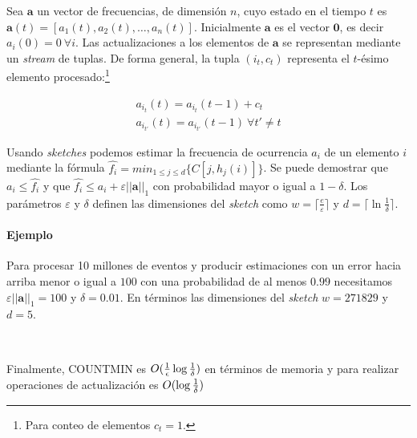 \documentclass[a4paper,10pt, oneside]{article}
\begin{document}
Sea $\mathbf{a}$ un vector de frecuencias, de dimensión $n$, cuyo estado en el tiempo $t$ es $\mathbf{a}(t)=[a_1(t), a_2(t), \dots, a_n(t)]$. Inicialmente $\mathbf{a}$ es el vector $\mathbf{0}$, es decir $a_i(0)=0 \ \forall i$. Las actualizaciones a los elementos de $\mathbf{a}$ se representan mediante un \textit{stream} de tuplas. De forma general, la tupla $(i_t, c_t)$ representa el $t$-ésimo elemento procesado:\footnote{Para conteo de elementos $c_t=1$.}

\begin{gather*}
a_{i_t}(t)=a_{i_t}(t-1) + c_t\\
a_{i_{t'}}(t)=a_{i_{t'}}(t-1) \ \forall t' \neq t 
\end{gather*}

Usando \textit{sketches} podemos estimar la frecuencia de ocurrencia $a_i$ de un elemento $i$ mediante la fórmula $\hat{f_i} = min_{1 \leq j \leq d}\{C[j,h_j(i)]\}$. Se puede demostrar que $a_i \leq \hat{f_i}$ y que $\hat{f_i} \leq a_i + \varepsilon ||\mathbf{a}||_1$ con probabilidad mayor o igual a $1-\delta$. Los parámetros $\varepsilon$ y $\delta$ definen las dimensiones del \textit{sketch} como $w=\lceil \frac{e}{\varepsilon}\rceil$ y $d=\lceil \ln \frac{1}{\delta} \rceil$.

\paragraph{Ejemplo} Para procesar 10 millones de eventos y producir estimaciones con un error hacia arriba menor o igual a $100$ con una probabilidad de al menos $0.99$ necesitamos $\varepsilon ||\mathbf{a}||_1=100$ y $\delta = 0.01$. En términos las dimensiones del \textit{sketch} $w=271829$ y $d=5$.

\

Finalmente, COUNTMIN es $O({1 \over \epsilon} \log {1 \over \delta})$ en términos de memoria y para realizar operaciones de actualización es $O(\log {1 \over \delta})$
\end{document}
